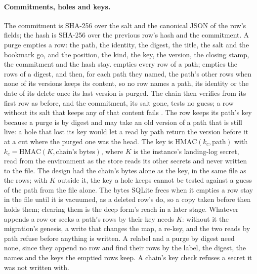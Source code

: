 \documentclass[11pt]{article}
\theoremstyle{plain}
\theoremstyle{definition}
\newcommand{\lean}[1]{\path{#1}}
\begin{document}
\paragraph{Commitments, holes and keys.}
The commitment is SHA-256 over the salt and the canonical JSON of the row's fields; the hash is
SHA-256 over the previous row's hash and the commitment. A purge empties a row: the path, the
identity, the digest, the title, the salt and the bookmark go, and the position, the kind, the
key, the version, the closing stamp, the commitment and the hash stay. \lean{remove} empties every
row of a path; \lean{remove_digest} empties the rows of a digest, and then, for each path they
named, the path's other rows when none of its versions keeps its content, so no row names a path,
its identity or the date of its delete once its last version is purged. The chain then verifies
from its first row as before, and the commitment, its salt gone, tests no guess; a row without its
salt that keeps any of that content fails \lean{verify}. The row keeps its path's key because a
purge is by digest and may take an old version of a path that is still live: a hole that lost its
key would let a read by path return the version before it at a cut where the purged one was the
head. The key is $\mathrm{HMAC}(k_c, \text{path})$ with $k_c = \mathrm{HMAC}(K, \text{chain's
bytes})$, where $K$ is the instance's landing-log secret, read from the environment as the store
reads its other secrets and never written to the file. The design had the chain's bytes alone as
the key, in the same file as the rows; with $K$ outside it, the key a hole keeps cannot be tested
against a guess of the path from the file alone. The bytes SQLite frees when it empties a row stay
in the file until it is vacuumed, as a deleted row's do, so a copy taken before then holds them;
clearing them is the deep form's reach in a later stage. Whatever appends a row or seeks a path's
rows by their key needs $K$: without it the migration's genesis, a write that changes the map, a
re-key, \lean{remove} and the two reads by path refuse before anything is written. A relabel and a
purge by digest need none, since they append no row and find their rows by the label, the digest,
the names and the keys the emptied rows keep. A chain's key check refuses a secret it was not
written with.
\end{document}
